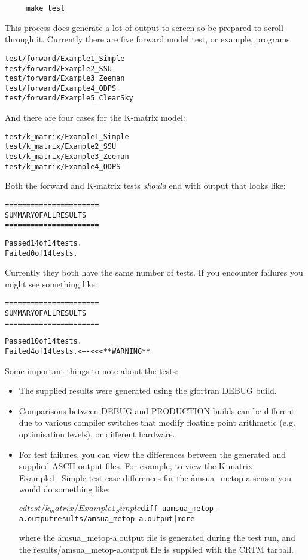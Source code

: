 \begin{verbatim}     make test\end{verbatim}
   
This process does generate a lot of output to screen so be prepared to scroll through it. Currently there are five forward model test, or example, programs:
\begin{alltt}
  test/forward/Example1_Simple
  test/forward/Example2_SSU
  test/forward/Example3_Zeeman
  test/forward/Example4_ODPS
  test/forward/Example5_ClearSky\end{alltt}
And there are four cases for the K-matrix model:
\begin{alltt}
  test/k_matrix/Example1_Simple
  test/k_matrix/Example2_SSU
  test/k_matrix/Example3_Zeeman
  test/k_matrix/Example4_ODPS\end{alltt}

Both the forward and K-matrix tests \emph{should} end with output that looks like:

\begin{alltt}
  ======================
  SUMMARY OF ALL RESULTS
  ======================

  Passed 14 of 14 tests.
  Failed 0 of 14 tests.\end{alltt}

Currently they both have the same number of tests. If you encounter failures you might see something like:

\begin{alltt}
  ======================
  SUMMARY OF ALL RESULTS
  ======================

  Passed 10 of 14 tests.
  Failed 4 of 14 tests.  <----<<<  **WARNING**\end{alltt}

Some important things to note about the tests:
\begin{itemize}
  \item The supplied results were generated using the gfortran DEBUG build.
  \item Comparisons between DEBUG and PRODUCTION builds can be different due to various compiler switches that modify floating point arithmetic (e.g. optimisation levels), or different hardware.
  \item For test failures, you can view the differences between the generated and supplied ASCII output files. For example, to view the K-matrix \f{Example1\_Simple} test case differences for the \f{amsua\_metop-a} sensor you would do something like:
\begin{alltt}
  $ cd test/k_matrix/Example1_Simple
  $ diff -u amsua_metop-a.output results/amsua_metop-a.output | more\end{alltt}

where the \f{amsua\_metop-a.output} file is generated during the test run, and the \f{results/amsua\_metop-a.output} file is supplied with the CRTM tarball.
\end{itemize}


